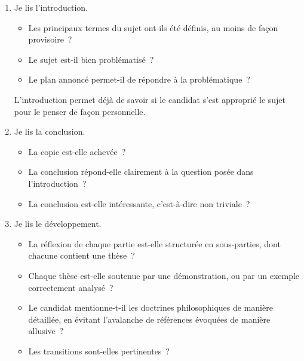 \documentclass[a4paper,11pt]{article}
\begin{document}
\begin{enumerate}
\item Je lis l'introduction.
  \begin{itemize}
  \item Les principaux termes du sujet ont-ils été définis, au moins de
    façon provisoire~?
  \item Le sujet est-il bien problématisé~?
  \item Le plan annoncé permet-il de répondre à la problématique~?
  \end{itemize}
L'introduction permet déjà de savoir si le candidat s'est approprié le
sujet pour le penser de façon personnelle. 

\item Je lis la conclusion.
  \begin{itemize}
  \item La copie est-elle achevée~?
  \item La conclusion répond-elle clairement à la question posée dans
    l'introduction~?
  \item La conclusion est-elle intéressante, c'est-à-dire non triviale~?
  \end{itemize}

\item Je lis le développement.
  \begin{itemize}
  \item La réflexion de chaque partie est-elle structurée en
    sous-parties, dont chacune contient une thèse~?
  \item Chaque thèse est-elle soutenue par une démonstration, ou par un
    exemple correctement analysé~?
  \item Le candidat mentionne-t-il les doctrines philosophiques de
    manière détaillée, en évitant l'avalanche de références évoquées de
    manière allusive~?
  \item Les transitions sont-elles pertinentes~?
  \end{itemize}


\end{enumerate}
\end{document}

